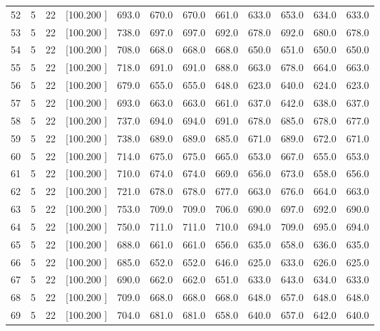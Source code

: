 \documentclass[12pt,a4paper]{article}
\begin{document}
\begin{center}
{\begin{tabular}{r r r r r r r r r r r r}
  52&  5& 22&[100.200   ]&   693.0&   670.0&   670.0&   661.0&   633.0&   653.0&   634.0&   633.0\\[-0.02in]
  53&  5& 22&[100.200   ]&   738.0&   697.0&   697.0&   692.0&   678.0&   692.0&   680.0&   678.0\\[-0.02in]
  54&  5& 22&[100.200   ]&   708.0&   668.0&   668.0&   668.0&   650.0&   651.0&   650.0&   650.0\\[-0.02in]
  55&  5& 22&[100.200   ]&   718.0&   691.0&   691.0&   688.0&   663.0&   678.0&   664.0&   663.0\\[-0.02in]
  56&  5& 22&[100.200   ]&   679.0&   655.0&   655.0&   648.0&   623.0&   640.0&   624.0&   623.0\\[-0.02in]
  57&  5& 22&[100.200   ]&   693.0&   663.0&   663.0&   661.0&   637.0&   642.0&   638.0&   637.0\\[-0.02in]
  58&  5& 22&[100.200   ]&   737.0&   694.0&   694.0&   691.0&   678.0&   685.0&   678.0&   677.0\\[-0.02in]
  59&  5& 22&[100.200   ]&   738.0&   689.0&   689.0&   685.0&   671.0&   689.0&   672.0&   671.0\\[-0.02in]
  60&  5& 22&[100.200   ]&   714.0&   675.0&   675.0&   665.0&   653.0&   667.0&   655.0&   653.0\\[-0.02in]
  61&  5& 22&[100.200   ]&   710.0&   674.0&   674.0&   669.0&   656.0&   673.0&   658.0&   656.0\\[-0.02in]
  62&  5& 22&[100.200   ]&   721.0&   678.0&   678.0&   677.0&   663.0&   676.0&   664.0&   663.0\\[-0.02in]
  63&  5& 22&[100.200   ]&   753.0&   709.0&   709.0&   706.0&   690.0&   697.0&   692.0&   690.0\\[-0.02in]
  64&  5& 22&[100.200   ]&   750.0&   711.0&   711.0&   710.0&   694.0&   709.0&   695.0&   694.0\\[-0.02in]
  65&  5& 22&[100.200   ]&   688.0&   661.0&   661.0&   656.0&   635.0&   658.0&   636.0&   635.0\\[-0.02in]
  66&  5& 22&[100.200   ]&   685.0&   652.0&   652.0&   646.0&   625.0&   633.0&   626.0&   625.0\\[-0.02in]
  67&  5& 22&[100.200   ]&   690.0&   662.0&   662.0&   651.0&   633.0&   643.0&   634.0&   633.0\\[-0.02in]
  68&  5& 22&[100.200   ]&   709.0&   668.0&   668.0&   668.0&   648.0&   657.0&   648.0&   648.0\\[-0.02in]
  69&  5& 22&[100.200   ]&   704.0&   681.0&   681.0&   658.0&   640.0&   657.0&   642.0&   640.0\\[-0.02in]

\end{tabular}}
\end{center}
\end{document}
